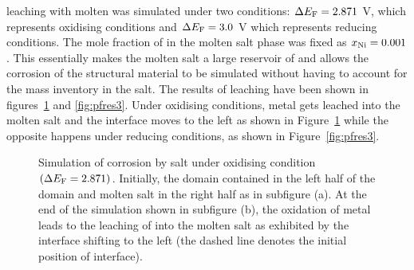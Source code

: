  leaching with molten  was simulated under two conditions: $\Delta E_{\ce{F}} = 2.871$ \si{\volt}, which represents oxidising conditions and $\Delta E_{\ce{F}} = 3.0$ \si{\volt} which represents reducing conditions. The mole fraction of  in the molten salt phase was fixed as $x_{\ce{Ni}} = 0.001$. This essentially makes the molten salt a large reservoir of  and allows the corrosion of the structural material to be simulated without having to account for the mass inventory in the salt. The results of  leaching have been shown in figures~\ref{fig:pfres2} and \ref{fig:pfres3}. Under oxidising conditions,  metal gets leached into the molten salt and the interface moves to the left as shown in Figure~\ref{fig:pfres2} while the opposite happens under reducing conditions, as shown in  Figure~\ref{fig:pfres3}. 
\begin{figure}[!ht]
    \hfill
    \caption[ corrosion by  salt under an oxidising condition $\left(\Delta E_{\ce{F}} = 2.871\right)$.]{Simulation of  corrosion by  salt under oxidising condition $\left(\Delta E_{\ce{F}} = 2.871\right)$. Initially, the domain contained  in the left half of the domain and molten salt in the right half as in subfigure (a). At the end of the simulation shown in subfigure (b), the oxidation of  metal leads to the leaching of  into the molten salt as exhibited by the interface shifting to the left (the dashed line denotes the initial position of interface).}
    \label{fig:pfres2}
\end{figure}

